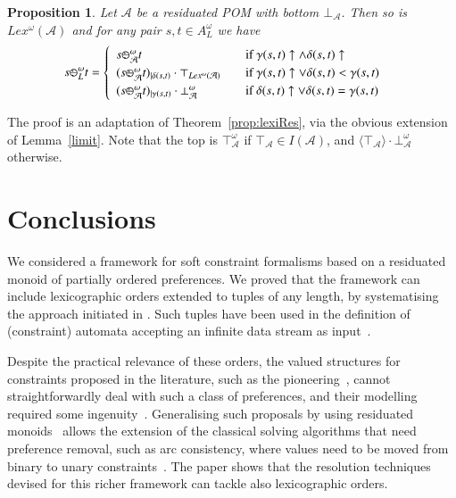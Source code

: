 \documentclass[a4paper]{elsarticle}
\newtheorem{proposition}{Proposition}
\newcommand{\1}{\mathbf{1}}
\def\odiv{{ \ominus\hspace{-8pt}:}\;}
\begin{document}

\begin{proposition}\label{prop:lexiResOmega}
	Let $\mathcal{A}$ be a residuated POM with bottom $\bot_\mathcal{A}$.
	Then so is $Lex^\omega(\mathcal{A})$
	and for any pair $s, t \in A^\omega_L$ we have
	\[
	s \odiv^\omega_L t = 	\begin{cases}
	\begin{array}{lcl}
	s \odiv^\omega_\mathcal{A} t & & \mbox{if  } \gamma(s,t) \uparrow \wedge \delta(s,t) \uparrow \\
	(s \odiv^\omega_\mathcal{A} t)_{\mid \delta(s,t)} \cdot \top_{Lex^\omega(\mathcal{A})} & &  \mbox{if  } \gamma(s,t) \uparrow \vee \delta(s,t) < \gamma(s,t) \\
	(s \odiv^\omega_\mathcal{A} t)_{\mid \gamma(s,t)} \cdot \bot^\omega_\mathcal{A} & & \mbox{if  } \delta(s,t)  \uparrow \vee \delta(s,t) = \gamma(s,t)
	\end{array}
	\end{cases}
	\]
\end{proposition}

The proof is an adaptation of Theorem~\ref{prop:lexiRes}, via the obvious extension of Lemma~\ref{limit}.
Note that the top is $\top_\mathcal{A}^\omega$
if $\top_\mathcal{A} \in I(\mathcal{A})$, and  $\langle \top_\mathcal{A} \rangle \cdot \bot_\mathcal{A}^\omega$ otherwise.

\section{Conclusions}\label{sec:conclusion}
We considered a framework for soft constraint formalisms based on a residuated monoid of partially ordered preferences.  
%
We proved that the framework can include lexicographic orders extended to tuples of any length, by systematising the approach initiated in \cite{sca}.
Such tuples have been used in the definition of (constraint) automata accepting an infinite data stream as input~\cite{sca}.

Despite the practical relevance of these orders, the valued structures for constraints proposed in the literature, 
such as the pioneering~\cite{jacm97,schiex}, cannot straightforwardly deal 
with such a class of preferences, and their modelling required some ingenuity~\cite{GadducciHMW13,valuation}. 
%
Generalising such proposals by using residuated monoids~\cite{residuation1} allows the extension of the classical solving algorithms 
that need preference removal, such as arc consistency, where values need to be moved from binary to unary constraints~\cite{ipl}.
%
The paper shows that the resolution techniques devised for this richer framework can tackle also lexicographic orders.
\end{document}
